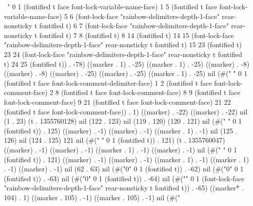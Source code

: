 {\
" 0 1 (fontified t face font-lock-variable-name-face) 1 5 (fontified t face font-lock-variable-name-face) 5 6 (font-lock-face "rainbow-delimiters-depth-1-face" rear-nonsticky t fontified t) 6 7 (font-lock-face "rainbow-delimiters-depth-1-face" rear-nonsticky t fontified t) 7 8 (fontified t) 8 14 (fontified t) 14 15 (font-lock-face "rainbow-delimiters-depth-1-face" rear-nonsticky t fontified t) 15 23 (fontified t) 23 24 (font-lock-face "rainbow-delimiters-depth-1-face" rear-nonsticky t fontified t) 24 25 (fontified t)) . -78) ((marker . 1) . -25) ((marker . 1) . -25) ((marker) . -8) ((marker) . -8) ((marker) . -25) ((marker) . -25) ((marker . 1) . -25) nil (#("%
" 0 1 (fontified t face font-lock-comment-delimiter-face) 1 2 (fontified t face font-lock-comment-face) 2 8 (fontified t face font-lock-comment-face) 8 9 (fontified t face font-lock-comment-face) 9 21 (fontified t face font-lock-comment-face) 21 22 (fontified t face font-lock-comment-face)) . 1) ((marker) . -22) ((marker) . -22) nil (1 . 23) (t . 1355760128) nil (122 . 123) nil (119 . 120) (120 . 121) nil (#("
" 0 1 (fontified t)) . 125) ((marker) . -1) ((marker) . -1) ((marker . 1) . -1) nil (125 . 126) nil (124 . 125) 121 nil (#("
" 0 1 (fontified t)) . 121) (t . 1355760047) ((marker) . -1) ((marker) . -1) ((marker . 1) . -1) ((marker) . -1) nil (#("
" 0 1 (fontified t)) . 121) ((marker) . -1) ((marker) . -1) ((marker . 1) . -1) ((marker . 1) . -1) ((marker) . -1) nil (62 . 63) nil (#("0" 0 1 (fontified t)) . -62) nil (#("0" 0 1 (fontified t)) . -63) nil (#("0" 0 1 (fontified t)) . -64) nil (#("}" 0 1 (font-lock-face "rainbow-delimiters-depth-1-face" rear-nonsticky t fontified t)) . -65) ((marker* . 104) . 1) ((marker . 105) . -1) ((marker . 105) . -1) nil (#("
